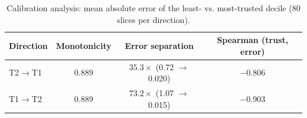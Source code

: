 \begin{table}[htbp]
\centering\small
\caption{Calibration analysis: mean absolute error of the least- vs.
most-trusted decile (80 slices per direction).}
\label{tab:calibration_en}
\begin{tabular}{lccc}
\toprule
Direction & Monotonicity & Error separation & Spearman (trust, error) \\
\midrule
T2$\to$T1 & 0.889 & $35.3\times$ (0.72 $\to$ 0.020) & $-0.806$ \\
T1$\to$T2 & 0.889 & $73.2\times$ (1.07 $\to$ 0.015) & $-0.903$ \\
\bottomrule
\end{tabular}
\end{table}
